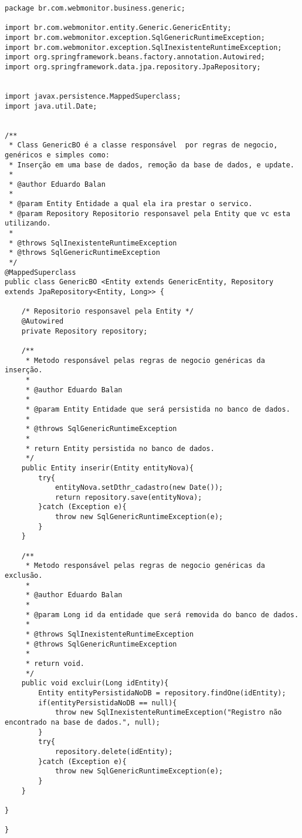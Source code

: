 \begin{lstlisting}[style=Java, label=Func:GenericBO,caption={[Entidade genérica GenericBO.]Entidade genérica GenericBO e suas funcionalidades.}]
package br.com.webmonitor.business.generic;

import br.com.webmonitor.entity.Generic.GenericEntity;
import br.com.webmonitor.exception.SqlGenericRuntimeException;
import br.com.webmonitor.exception.SqlInexistenteRuntimeException;
import org.springframework.beans.factory.annotation.Autowired;
import org.springframework.data.jpa.repository.JpaRepository;


import javax.persistence.MappedSuperclass;
import java.util.Date;


/**
 * Class GenericBO é a classe responsável  por regras de negocio, genéricos e simples como:
 * Inserção em uma base de dados, remoção da base de dados, e update.
 *
 * @author Eduardo Balan
 *
 * @param Entity Entidade a qual ela ira prestar o servico.
 * @param Repository Repositorio responsavel pela Entity que vc esta utilizando.
 *
 * @throws SqlInexistenteRuntimeException
 * @throws SqlGenericRuntimeException
 */
@MappedSuperclass
public class GenericBO <Entity extends GenericEntity, Repository extends JpaRepository<Entity, Long>> {

    /* Repositorio responsavel pela Entity */
    @Autowired
    private Repository repository;

    /**
     * Metodo responsável pelas regras de negocio genéricas da inserção.
     *
     * @author Eduardo Balan
     *
     * @param Entity Entidade que será persistida no banco de dados.
     *
     * @throws SqlGenericRuntimeException
     *
     * return Entity persistida no banco de dados.
     */
    public Entity inserir(Entity entityNova){
        try{
            entityNova.setDthr_cadastro(new Date());
            return repository.save(entityNova);
        }catch (Exception e){
            throw new SqlGenericRuntimeException(e);
        }
    }

    /**
     * Metodo responsável pelas regras de negocio genéricas da exclusão.
     *
     * @author Eduardo Balan
     *
     * @param Long id da entidade que será removida do banco de dados.
     *
     * @throws SqlInexistenteRuntimeException
     * @throws SqlGenericRuntimeException
     *
     * return void.
     */
    public void excluir(Long idEntity){
        Entity entityPersistidaNoDB = repository.findOne(idEntity);
        if(entityPersistidaNoDB == null){
            throw new SqlInexistenteRuntimeException("Registro não encontrado na base de dados.", null);
        }
        try{
            repository.delete(idEntity);
        }catch (Exception e){
            throw new SqlGenericRuntimeException(e);
        }
    }

}

}
\end{lstlisting}


